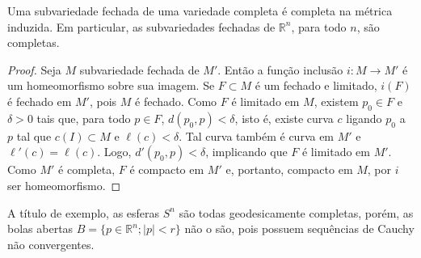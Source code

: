 \begin{corollary}
    \label{cor:subvariedade-fechada}
    Uma subvariedade fechada de uma variedade completa é completa na métrica induzida. Em particular, as subvariedades fechadas de $\mathbb{R}^n$, para todo $n$, são completas.
    \begin{proof}

        Seja $M$ subvariedade fechada de $M'$. Então a função inclusão $i:M\to M'$ é um homeomorfismo sobre sua imagem.
        Se $F \subset M$ é um fechado e limitado, $i(F)$ é fechado em $M'$, pois $M$ é fechado.
        Como $F$ é limitado em $M$, existem $p_0 \in F$ e $\delta>0$ tais que, para todo $p \in F$, $d(p_0, p) < \delta$, isto é, existe curva $c$ ligando $p_0$ a $p$ tal que $c(I) \subset M$ e $\ell(c) < \delta$.
        Tal curva também é curva em $M'$ e $\ell'(c) = \ell(c)$. Logo, $d'(p_0, p) < \delta$, implicando que $F$ é limitado em $M'$.
        Como $M'$ é completa, $F$ é compacto em $M'$ e, portanto, compacto em $M$, por $i$ ser homeomorfismo.
    \end{proof}
\end{corollary}
A título de exemplo, as esferas $S^{n}$ são todas geodesicamente completas, porém, as bolas abertas $B=\{ p \in \mathbb{R}^{n}; |p|<r \}$ não o são, pois possuem sequências de Cauchy não convergentes.
